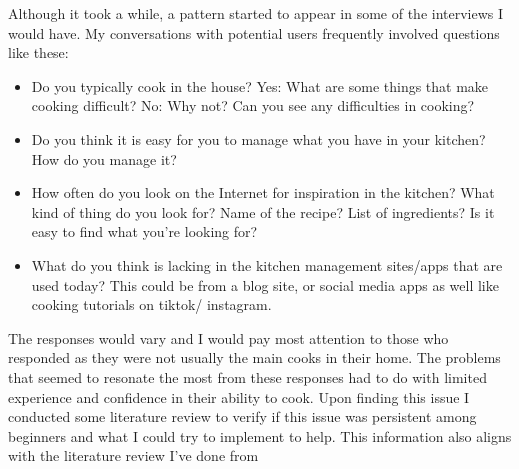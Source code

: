 \documentclass[10pt,twocolumn]{article}
\begin{document}
Although it took a while, a pattern started to appear in some of the interviews I would have. My conversations with potential users frequently involved questions like these: 
\begin{itemize}
    \item Do you typically cook in the house? 
    Yes: What are some things that make cooking difficult?
    No: Why not? Can you see any difficulties in cooking?

    \item Do you think it is easy for you to manage what you have in your kitchen?
    How do you manage it? 
 
    \item How often do you look on the Internet for inspiration in the kitchen?
    What kind of thing do you look for? Name of the recipe? List of ingredients? 
    Is it easy to find what you’re looking for?
    
    \item What do you think is lacking in the kitchen management sites/apps that are used today? This could be from a blog site, or social media apps as well like cooking tutorials on tiktok/ instagram. 
\end{itemize}
The responses would vary and I would pay most attention to those who responded as they were not usually the main cooks in their home. The problems that seemed to resonate the most from these responses had to do with limited experience and confidence in their ability to cook. Upon finding this issue I conducted some literature review to verify if this issue was persistent among beginners and what I could try to implement to help. This information also aligns with the literature review I've done from \cite{Farmer2021} \cite{Lavelle2016} \cite{Taillie2018}
\end{document}
